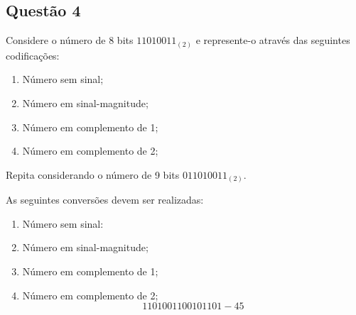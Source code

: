 \documentclass{article}
\begin{document}
        \subsection{Questão 4}
            \begin{exercise}
                Considere o número de 8 bits $11010011_{(2)}$ e represente-o através das seguintes codificações:
                    \begin{enumerate}[noitemsep]
                        \item Número sem sinal;
                        \item Número em sinal-magnitude;
                        \item Número em complemento de 1;
                        \item Número em complemento de 2;
                    \end{enumerate}
                Repita considerando o número de 9 bits $011010011_{(2)}$.
            \end{exercise}
            \begin{resolution}
                As seguintes conversões devem ser realizadas:
                \begin{enumerate}
                    \item Número sem sinal:
                        \begin{figure}[H]
                            \centering
                        \end{figure}

                    \item Número em sinal-magnitude;

                    \item Número em complemento de 1;

                    \item Número em complemento de 2;
                        \begin{equation*}
                            11010011
                            00101101
                            -45
                        \end{equation*}
                \end{enumerate}
            \end{resolution}
\newpage
\end{document}
